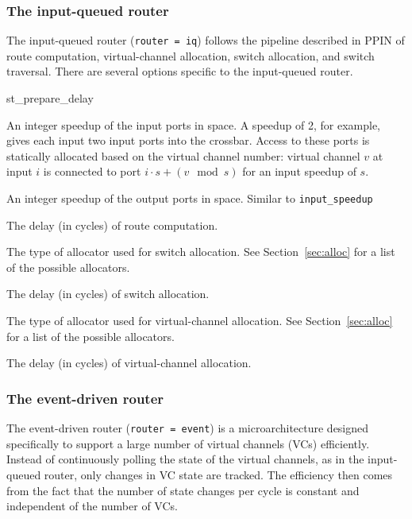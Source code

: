 \documentclass[11pt]{article}
\begin{document}
\subsubsection{The input-queued router}
\label{sec:iq_router}

The input-queued router (\texttt{router = iq}) follows the pipeline
described in PPIN of route computation, virtual-channel allocation,
switch allocation, and switch traversal.  There are several options
specific to the input-queued router.

\begin{opt_list}{st\_prepare\_delay}

\item[input\_speedup] An integer speedup of the input ports in space.
A speedup of 2, for example, gives each input two input ports into the
crossbar.  Access to these ports is statically allocated based on the
virtual channel number: virtual channel $v$ at input $i$ is connected
to port $i \cdot s + (v \mod s)$ for an input speedup of $s$.

\item[output\_speedup] An integer speedup of the output ports in
space.  Similar to \texttt{input\_speedup}

\item[routing\_delay] The delay (in cycles) of route computation.

\item[sw\_allocator] The type of allocator used for switch allocation.
See Section~\ref{sec:alloc} for a list of the possible allocators.

\item[sw\_alloc\_delay] The delay (in cycles) of switch allocation.

\item[vc\_allocator] The type of allocator used for virtual-channel
allocation.  See Section~\ref{sec:alloc} for a list of the possible
allocators.

\item[vc\_alloc\_delay] The delay (in cycles) of virtual-channel
allocation.

\end{opt_list}

\subsubsection{The event-driven router}
\label{sec:event_router}

The event-driven router (\texttt{router = event}) is a
microarchitecture designed specifically to support a large number of
virtual channels (VCs) efficiently.  Instead of continuously polling
the state of the virtual channels, as in the input-queued router, only
changes in VC state are tracked.  The efficiency then comes from the
fact that the number of state changes per cycle is constant and
independent of the number of VCs.
\end{document}
